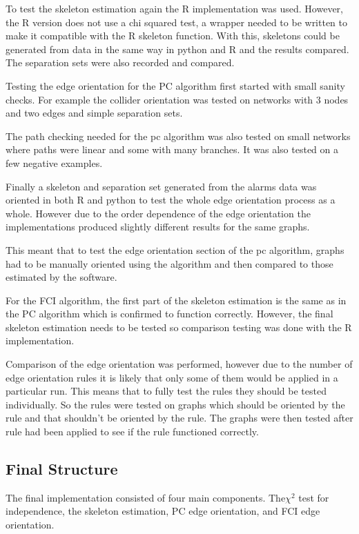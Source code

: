 \documentclass{UoYCSproject}
\begin{document}
To test the skeleton estimation again the R implementation was used. However, the R version does not use a chi squared test, a wrapper needed to be written to make it compatible with the R skeleton function. With this, skeletons could be generated from data in the same way in python and R and the results compared. The separation sets were also recorded and compared.

Testing the edge orientation for the PC algorithm first started with small sanity checks. For example the collider orientation was tested on networks with 3 nodes and two edges and simple separation sets.

The path checking needed for the pc algorithm was also  tested on small networks where paths were linear and some with many branches. It was also tested on a few negative examples.

Finally a skeleton and separation set generated from the alarms data was oriented in both R and python to test the whole edge orientation process as a whole. However due to the order dependence of the edge orientation the implementations produced slightly different results for the same graphs.

This meant that to test the edge orientation section of the pc algorithm, graphs had to be manually oriented using the algorithm and then compared to those estimated by the software.

For the FCI algorithm, the first part of the skeleton estimation is the same as in the PC algorithm  which is confirmed to function correctly. However, the final skeleton estimation needs to be tested so comparison testing was done with the R implementation.

Comparison of the edge orientation was performed, however due to the number of edge orientation rules it is likely that only some of them would be applied in a particular run. This means that to fully test  the rules they should be tested individually. So the rules were tested on graphs which should be oriented by the rule and that shouldn't be oriented by the rule. The graphs were then tested after rule had been applied to see if the rule functioned correctly.


\subsection{Final Structure}
The final implementation consisted of four main components. The$\chi^2$ test for independence, the skeleton estimation, PC edge orientation, and FCI edge orientation.
\end{document}
